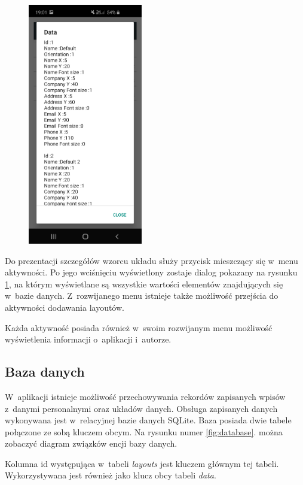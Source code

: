 \documentclass[a4paper,12pt, twoside]{article}
\begin{document}
\begin{enumerate}
\begin{figure}[H]
\begin{minipage}{.5\textwidth}
    	            \includegraphics[width=5cm]{images/view_layoutDetails.jpg}
                    \label{fig:layoutlistDialog}
                \end{minipage}%
    	   \end{figure}
           Do prezentacji szczegółów wzorcu układu służy przycisk mieszczący się w~menu aktywności. Po jego wciśnięciu wyświetlony zostaje dialog pokazany na rysunku \ref{fig:layoutlistDialog}, na którym wyświetlane są wszystkie wartości elementów znajdujących się w~bazie danych. Z~rozwijanego menu istnieje także możliwość przejścia do aktywności dodawania layoutów.
           
    	\end{enumerate}
    	
    	Każda aktywność posiada również w~swoim rozwijanym menu możliwość wyświetlenia informacji o~aplikacji i~autorze.
 
        \subsection{Baza danych}
        W~aplikacji istnieje możliwość przechowywania rekordów zapisanych wpisów z~danymi personalnymi oraz układów danych. Obsługa zapisanych danych wykonywana jest w~relacyjnej bazie danych SQLite. Baza posiada dwie tabele połączone ze sobą kluczem obcym. Na rysunku numer \ref{fig:database}. można zobaczyć diagram związków encji bazy danych. 
        
        Kolumna id występująca w~tabeli \textit{layouts} jest kluczem głównym tej tabeli. Wykorzystywana jest również jako klucz obcy tabeli \textit{data}. 
        
\end{document}

